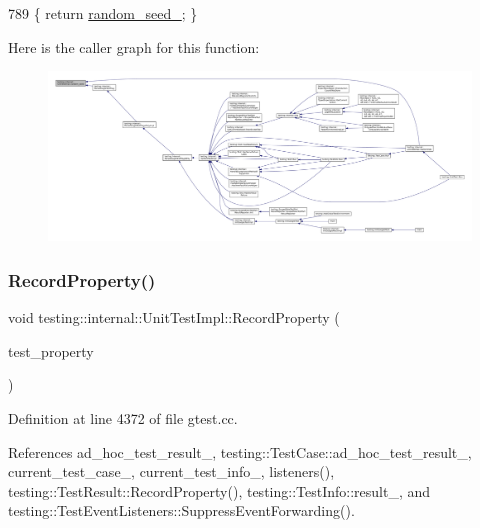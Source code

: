 \begin{DoxyCode}
789 \{ \textcolor{keywordflow}{return} \hyperlink{classtesting_1_1internal_1_1UnitTestImpl_a0afcc95308ebfacb8d0f53790e77e1ab}{random\_seed\_}; \}
\end{DoxyCode}
Here is the caller graph for this function\+:
\nopagebreak
\begin{figure}[H]
\begin{center}
\leavevmode
\includegraphics[width=350pt]{classtesting_1_1internal_1_1UnitTestImpl_a625b9fb6d17b008c44fc902255e6343c_icgraph}
\end{center}
\end{figure}
\mbox{\label{classtesting_1_1internal_1_1UnitTestImpl_a15e4af4df167d2504decbc8fcc108a6f}} 
\subsubsection{\texorpdfstring{Record\+Property()}{RecordProperty()}}
{\footnotesize\ttfamily void testing\+::internal\+::\+Unit\+Test\+Impl\+::\+Record\+Property (\begin{DoxyParamCaption}\item[{const \hyperlink{classtesting_1_1TestProperty}{Test\+Property} \&}]{test\+\_\+property }\end{DoxyParamCaption})}



Definition at line 4372 of file gtest.\+cc.



References ad\+\_\+hoc\+\_\+test\+\_\+result\+\_\+, testing\+::\+Test\+Case\+::ad\+\_\+hoc\+\_\+test\+\_\+result\+\_\+, current\+\_\+test\+\_\+case\+\_\+, current\+\_\+test\+\_\+info\+\_\+, listeners(), testing\+::\+Test\+Result\+::\+Record\+Property(), testing\+::\+Test\+Info\+::result\+\_\+, and testing\+::\+Test\+Event\+Listeners\+::\+Suppress\+Event\+Forwarding().


